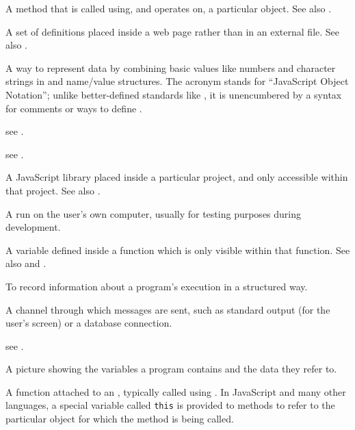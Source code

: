 \begin{description}
A method that is called using, and operates on, a particular object.
See also .

A set of  definitions placed inside a web page rather than in an
external file.
See also .

A way to represent data by combining basic values like numbers and character
strings in  and name/value structures. The acronym stands
for ``JavaScript Object Notation''; unlike better-defined standards like
, it is unencumbered by a syntax for comments or ways to define
.

see .

see .

A JavaScript library placed inside a particular project, and only accessible
within that project. See also .

A  run on the user's own computer, usually for testing
purposes during development.

A variable defined inside a function which is only visible within that
function. See also  and
.

To record information about a program's execution in a structured way.

A channel through which  messages are sent, such as
standard output (for the user's screen) or a database connection.

see .

A picture showing the variables a program contains and the data they refer to.

A function attached to an , typically called using . In JavaScript and many other languages, a
special variable called \texttt{this} is provided to methods to refer to the
particular object for which the method is being called.


\end{description}

